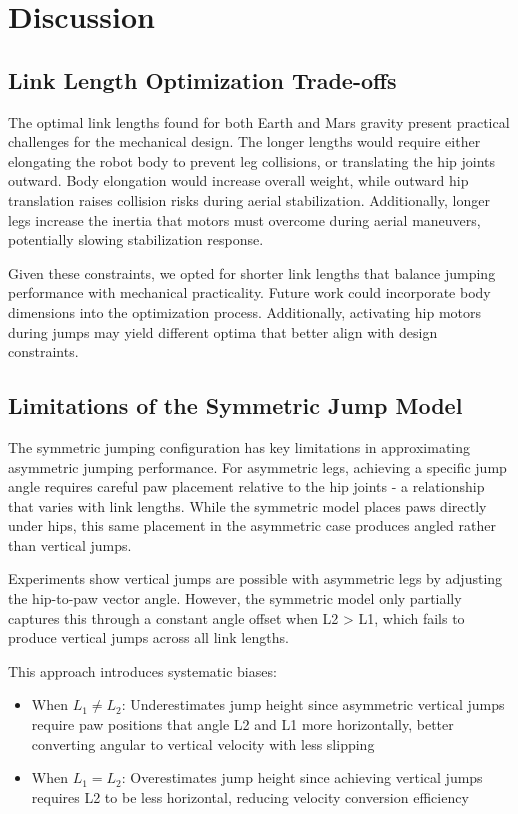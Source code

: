 \section{Discussion}

\subsection{Link Length Optimization Trade-offs}
The optimal link lengths found for both Earth and Mars gravity present practical challenges for the mechanical design. The longer lengths would require either elongating the robot body to prevent leg collisions, or translating the hip joints outward. Body elongation would increase overall weight, while outward hip translation raises collision risks during aerial stabilization. Additionally, longer legs increase the inertia that motors must overcome during aerial maneuvers, potentially slowing stabilization response.

Given these constraints, we opted for shorter link lengths that balance jumping performance with mechanical practicality. Future work could incorporate body dimensions into the optimization process. Additionally, activating hip motors during jumps may yield different optima that better align with design constraints.

\subsection{Limitations of the Symmetric Jump Model}
The symmetric jumping configuration has key limitations in approximating asymmetric jumping performance. For asymmetric legs, achieving a specific jump angle requires careful paw placement relative to the hip joints - a relationship that varies with link lengths. While the symmetric model places paws directly under hips, this same placement in the asymmetric case produces angled rather than vertical jumps.

Experiments show vertical jumps are possible with asymmetric legs by adjusting the hip-to-paw vector angle. However, the symmetric model only partially captures this through a constant angle offset when L2 > L1, which fails to produce vertical jumps across all link lengths.

This approach introduces systematic biases:
\begin{itemize}
    \item When \(L_1 \neq L_2\): Underestimates jump height since asymmetric vertical jumps require paw positions that angle L2 and L1 more horizontally, better converting angular to vertical velocity with less slipping
    \item When \(L_1 = L_2\): Overestimates jump height since achieving vertical jumps requires L2 to be less horizontal, reducing velocity conversion efficiency
\end{itemize}

